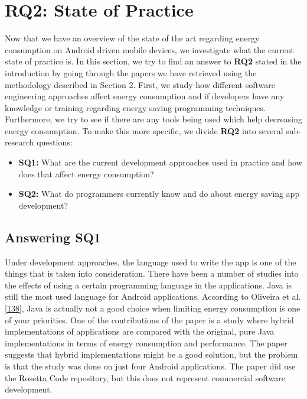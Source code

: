 \documentclass[]{book}
\providecommand{\tightlist}{%
  \setlength{\itemsep}{0pt}\setlength{\parskip}{0pt}}
\begin{document}
\section{RQ2: State of Practice}\label{rq2-state-of-practice}

Now that we have an overview of the state of the art regarding energy
consumption on Android driven mobile devices, we investigate what the
current state of practice is. In this section, we try to find an answer
to \textbf{RQ2} stated in the introduction by going through the papers
we have retrieved using the methodology described in Section 2. First,
we study how different software engineering approaches affect energy
consumption and if developers have any knowledge or training regarding
energy saving programming techniques. Furthermore, we try to see if
there are any tools being used which help decreasing energy consumption.
To make this more specific, we divide \textbf{RQ2} into several
sub-research questions:

\begin{itemize}
\tightlist
\item
  \textbf{SQ1:} What are the current development approaches used in
  practice and how does that affect energy consumption?
\item
  \textbf{SQ2:} What do programmers currently know and do about energy
  saving app development?
\end{itemize}

\subsection{Answering SQ1}\label{answering-sq1}

Under development approaches, the language used to write the app is one
of the things that is taken into consideration. There have been a number
of studies into the effects of using a certain programming language in
the applications. Java is still the most used language for Android
applications. According to Oliveira et al.
{[}\protect\hyperlink{ref-OOC2017}{138}{]}, Java is actually not a good
choice when limiting energy consumption is one of your priorities. One
of the contributions of the paper is a study where hybrid
implementations of applications are compared with the original, pure
Java implementations in terms of energy consumption and performance. The
paper suggests that hybrid implementations might be a good solution, but
the problem is that the study was done on just four Android
applications. The paper did use the Rosetta Code repository, but this
does not represent commercial software development.
\end{document}
